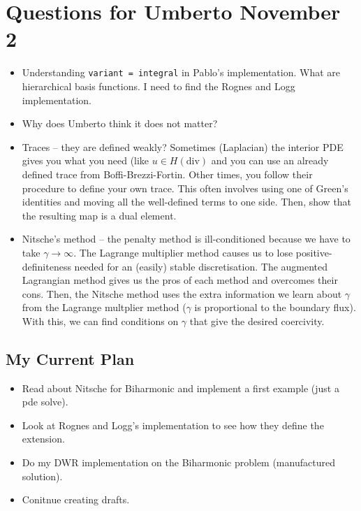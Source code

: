 \documentclass[12pt,a4paper]{article}
\begin{document}
\section{Questions for Umberto November 2}

\begin{itemize}
    \item Understanding \texttt{variant = integral} in Pablo's implementation. What are hierarchical basis functions. I need to find the Rognes and Logg implementation.
    \item Why does Umberto think it does not matter?
    \item Traces -- they are defined weakly? Sometimes (Laplacian) the interior PDE gives you what you need (like $u \in H(\text{div})$ and you can use an already defined trace from Boffi-Brezzi-Fortin. Other times, you follow their procedure to define your own trace. This often involves using one of Green's identities and moving all the well-defined terms to one side. Then, show that the resulting map is a dual element. 

    \item Nitsche's method -- the penalty method is ill-conditioned because we have to take $\gamma \rightarrow \infty.$ The Lagrange multiplier method causes us to lose positive-definiteness needed for an (easily) stable discretisation.  The augmented Lagrangian method gives us the pros of each method and overcomes their cons. Then, the Nitsche method uses the extra information we learn about $\gamma$ from the Lagrange multplier method ($\gamma$ is proportional to the boundary flux). With this, we can find conditions on $\gamma$ that give the desired coercivity. 
\end{itemize}

\subsection{My Current Plan}

\begin{itemize}
    \item Read about Nitsche for Biharmonic and implement a first example (just a pde solve). 
    \item Look at Rognes and Logg's implementation to see how they define the extension. 
    \item Do my DWR implementation on the Biharmonic problem (manufactured solution). 
    \item Conitnue creating drafts. 
\end{itemize}
\end{document}
